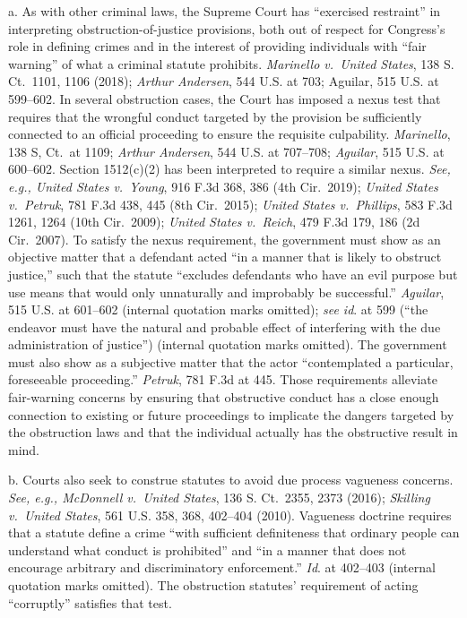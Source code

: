 a. As with other criminal laws, the Supreme Court has ``exercised restraint'' in interpreting obstruction-of-justice provisions, both out of respect for Congress's role in defining crimes and in the interest of providing individuals with ``fair warning'' of what a criminal statute prohibits.
\textit{Marinello v.\ United States}, 138 S. Ct.~1101, 1106 (2018);
\textit{Arthur Andersen}, 544 U.S. at 703; Aguilar, 515 U.S. at 599--602.
In several obstruction cases, the Court has imposed a nexus test that requires that the wrongful conduct targeted by the provision be sufficiently connected to an official proceeding to ensure the requisite culpability.
\textit{Marinello}, 138 S, Ct.~at 1109;
\textit{Arthur Andersen}, 544 U.S. at 707--708;
\textit{Aguilar}, 515 U.S. at 600--602.
Section 1512(c)(2) has been interpreted to require a similar nexus.
\textit{See, e.g., United States v.\ Young}, 916 F.3d 368, 386 (4th Cir.~2019);
\textit{United States v.\ Petruk}, 781 F.3d 438, 445 (8th Cir.~2015);
\textit{United States v.\ Phillips}, 583 F.3d 1261, 1264 (10th Cir.~2009);
\textit{United States v.\ Reich}, 479 F.3d 179, 186 (2d Cir.~2007).
To satisfy the nexus requirement, the government must show as an objective matter that a defendant acted ``in a manner that is likely to obstruct justice,'' such that the statute ``excludes defendants who have an evil purpose but use means that would only unnaturally and improbably be successful.''
\textit{Aguilar}, 515 U.S. at 601--602 (internal quotation marks omitted);
\textit{see id}. at 599 (``the endeavor must have the natural and probable effect of interfering with the due administration of justice'') (internal quotation marks omitted).
The government must also show as a subjective matter that the actor ``contemplated a particular, foreseeable proceeding.''
\textit{Petruk}, 781 F.3d at 445.
Those requirements alleviate fair-warning concerns by ensuring that obstructive conduct has a close enough connection to existing or future proceedings to implicate the dangers targeted by the obstruction laws and that the individual actually has the obstructive result in mind.

b. Courts also seek to construe statutes to avoid due process vagueness concerns.
\textit{See, e.g., McDonnell v.\ United States}, 136 S. Ct.~2355, 2373 (2016);
\textit{Skilling v.\ United States}, 561 U.S. 358, 368, 402--404 (2010).
Vagueness doctrine requires that a statute define a crime ``with sufficient definiteness that ordinary people can understand what conduct is prohibited'' and ``in a manner that does not encourage arbitrary and discriminatory enforcement.''
\textit{Id}. at 402--403 (internal quotation marks omitted).
The obstruction statutes' requirement of acting ``corruptly'' satisfies that test.

